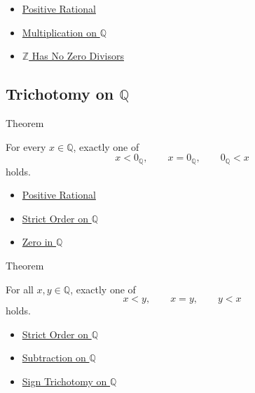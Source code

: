 \begin{dependencies}
\begin{itemize}
  \item \hyperref[def:positive-rational]{Positive Rational}
  \item \hyperref[def:multiplication-on-q-classes]{Multiplication on $\mathbb{Q}$}
  \item \hyperref[thm:z-has-no-zero-divisors]{$\mathbb{Z}$ Has No Zero Divisors}
\end{itemize}
\end{dependencies}

\subsection*{\texorpdfstring{Trichotomy on $\mathbb{Q}$}{Trichotomy on Q}}

\begin{theorembox}{Theorem}
\begin{theorem}
\label{thm:sign-trichotomy-on-q}
For every $x\in\mathbb{Q}$, exactly one of
\[
x<0_{\mathbb{Q}},\qquad x=0_{\mathbb{Q}},\qquad 0_{\mathbb{Q}}<x
\]
holds.
\end{theorem}
\end{theorembox}

\begin{dependencies}
\begin{itemize}
  \item \hyperref[def:positive-rational]{Positive Rational}
  \item \hyperref[def:strict-order-on-q]{Strict Order on $\mathbb{Q}$}
  \item \hyperref[def:zero-in-q]{Zero in $\mathbb{Q}$}
\end{itemize}
\end{dependencies}

\begin{theorembox}{Theorem}
\begin{theorem}
\label{thm:trichotomy-on-q}
For all $x,y\in\mathbb{Q}$, exactly one of
\[
x<y,\qquad x=y,\qquad y<x
\]
holds.
\end{theorem}
\end{theorembox}

\begin{dependencies}
\begin{itemize}
  \item \hyperref[def:strict-order-on-q]{Strict Order on $\mathbb{Q}$}
  \item \hyperref[def:subtraction-on-q]{Subtraction on $\mathbb{Q}$}
  \item \hyperref[thm:sign-trichotomy-on-q]{Sign Trichotomy on $\mathbb{Q}$}
\end{itemize}
\end{dependencies}

